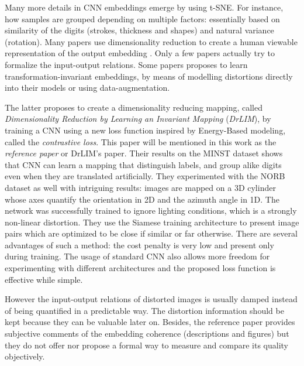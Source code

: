 \documentclass[a4paper,12pt]{report}
\begin{document}
Many more details in CNN embeddings emerge by using t-SNE.
For instance, how samples are grouped depending on multiple factors: essentially based on similarity of the digits (strokes, thickness and shapes) and natural variance (rotation).
Many papers use dimensionality reduction to create a human viewable representation of the output embedding \cite{donahue2013decaf}\cite{yu2014visualizing}\cite{yaotiny}.
Only a few papers actually try to formalize the input-output relations\cite{goodfellow2009measuring}.
Some papers proposes to learn transformation-invariant embeddings, by means of modelling distortions directly into their models\cite{gens2014deep} or using data-augmentation\cite{hadsell2006dimensionality}.

The latter proposes to create a dimensionality reducing mapping, called {\em Dimensionality Reduction by Learning an Invariant Mapping} ({\em DrLIM}), by training a CNN using a new loss function inspired by Energy-Based modeling, called the {\em contrastive loss}.
This paper will be mentioned in this work as the {\em reference paper} or DrLIM's paper.
Their results on the MINST dataset\cite{lecun1998mnist} shows that CNN can learn a mapping that distinguish labels, and group alike digits even when they are translated artificially.
They experimented with the NORB dataset\cite{lecun2004learning} as well with intriguing results: images are mapped on a 3D cylinder whose axes quantify the orientation in 2D and the azimuth angle in 1D.
The network was successfully trained to ignore lighting conditions, which is a strongly non-linear distortion.
They use the Siamese training architecture to present image pairs which are optimized to be close if similar or far otherwise\cite{bromley1993signature}\cite{chopra2005learning}.
There are several advantages of such a method: the cost penalty is very low and present only during training.
The usage of standard CNN also allows more freedom for experimenting with different architectures and the proposed loss function is effective while simple.

However the input-output relations of distorted images is usually damped instead of being quantified in a predictable way.
The distortion information should be kept because they can be valuable later on.
Besides, the reference paper provides subjective comments of the embedding coherence (descriptions and figures) but they do not offer nor propose a formal way to measure and compare its quality objectively.
\end{document}
